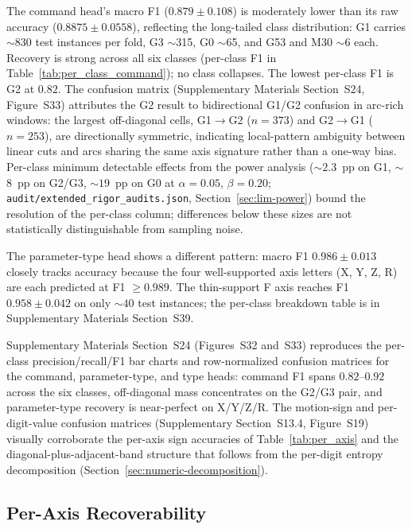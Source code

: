 \documentclass[sensors,article,submit,moreauthors,pdftex]{Definitions/mdpi}
\begin{document}
The command head's macro F1 ($0.879 \pm 0.108$) is moderately lower than its raw accuracy ($0.8875 \pm 0.0558$), reflecting the long-tailed class distribution: G1 carries $\sim$830 test instances per fold, G3 $\sim$315, G0 $\sim$65, and G53 and M30 $\sim$6 each. Recovery is strong across all six classes (per-class F1 in Table~\ref{tab:per_class_command}); no class collapses. The lowest per-class F1 is G2 at $0.82$. The confusion matrix (Supplementary Materials Section~S24, Figure~S33) attributes the G2 result to bidirectional G1/G2 confusion in arc-rich windows: the largest off-diagonal cells, G1$\to$G2 ($n\!=\!373$) and G2$\to$G1 ($n\!=\!253$), are directionally symmetric, indicating local-pattern ambiguity between linear cuts and arcs sharing the same axis signature rather than a one-way bias. Per-class minimum detectable effects from the power analysis ($\sim$$2.3$~pp on G1, $\sim$$8$~pp on G2/G3, $\sim$$19$~pp on G0 at $\alpha\!=\!0.05$, $\beta\!=\!0.20$; \texttt{audit/extended\_rigor\_audits.json}, Section~\ref{sec:lim-power}) bound the resolution of the per-class column; differences below these sizes are not statistically distinguishable from sampling noise.



The parameter-type head shows a different pattern: macro F1 $0.986 \pm 0.013$ closely tracks accuracy because the four well-supported axis letters (X, Y, Z, R) are each predicted at F1 $\ge\!0.989$. The thin-support F axis reaches F1 $0.958 \pm 0.042$ on only $\sim$$40$ test instances; the per-class breakdown table is in Supplementary Materials Section~S39.


Supplementary Materials Section~S24 (Figures~S32 and~S33) reproduces the per-class precision/recall/F1 bar charts and row-normalized confusion matrices for the command, parameter-type, and type heads: command F1 spans $0.82$--$0.92$ across the six classes, off-diagonal mass concentrates on the G2/G3 pair, and parameter-type recovery is near-perfect on X/Y/Z/R. The motion-sign and per-digit-value confusion matrices (Supplementary Section~S13.4, Figure~S19) visually corroborate the per-axis sign accuracies of Table~\ref{tab:per_axis} and the diagonal-plus-adjacent-band structure that follows from the per-digit entropy decomposition (Section~\ref{sec:numeric-decomposition}).

\subsection{Per-Axis Recoverability}
\label{sec:per-axis}
\end{document}
